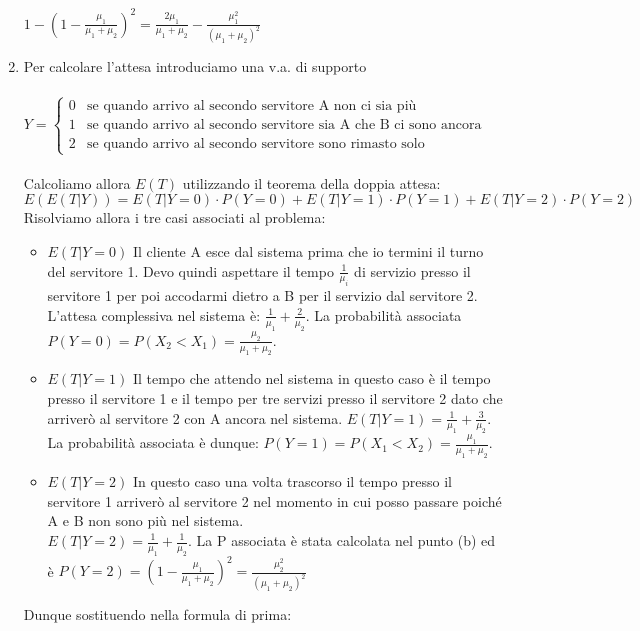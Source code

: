 \documentclass{oxmathproblems}
\begin{document}
\begin{questions}
\begin{solution}
\begin{enumerate}[label=(\alph*)]
        $1-(1-\frac{\mu_1}{\mu_1+\mu_2})^2 = \frac{2\mu_1}{\mu_1+\mu_2} - \frac{\mu_1^2}{(\mu_1+\mu_2)^2}$
        \item Per calcolare l'attesa introduciamo una v.a. di supporto\\ \\
        $Y= 
        \begin{cases}
            0 &\text{se quando arrivo al secondo servitore A non ci sia più}\\
            1 &\text{se quando arrivo al secondo servitore sia A che B ci sono ancora}\\
            2 &\text{se quando arrivo al secondo servitore sono rimasto solo}
        \end{cases}$\\\\
        Calcoliamo allora $E(T)$ utilizzando il teorema della doppia attesa:\\
        $E(E(T | Y)) = E(T | Y=0) \cdot P(Y=0) + E(T | Y=1) \cdot P(Y=1) + E(T | Y=2) \cdot P(Y=2)$\\
        Risolviamo allora i tre casi associati al problema:
        \begin{itemize}
            \item $E(T | Y=0)$ Il cliente A esce dal sistema prima che io termini il turno del servitore 1. Devo quindi aspettare il tempo $\frac{1}{\mu_i}$ di servizio presso il servitore 1 per poi accodarmi dietro a B per il servizio dal servitore 2. L'attesa complessiva nel sistema è: $\frac{1}{\mu_1} + \frac{2}{\mu_2}$. La probabilità associata $P(Y=0)= P(X_2< X_1) = \frac{\mu_2}{\mu_1+\mu_2}$.
            \item $E(T | Y=1)$ Il tempo che attendo nel sistema in questo caso è il tempo presso il servitore 1 e il tempo per tre servizi presso il servitore 2 dato che arriverò al servitore 2 con A ancora nel sistema. $E(T|Y=1)= \frac{1}{\mu_1} + \frac{3}{\mu_2}$. La probabilità associata è dunque: $P(Y=1) = P(X_1< X_2) = \frac{\mu_1}{\mu_1+\mu_2}$.
            \item $E(T | Y=2)$ In questo caso una volta trascorso il tempo presso il servitore 1 arriverò al servitore 2 nel momento in cui posso passare poiché A e B non sono più nel sistema.\\
            $E(T | Y=2) = \frac{1}{\mu_1}+\frac{1}{\mu_2}$. La P associata è stata calcolata nel punto (b) ed è $P(Y=2)= (1-\frac{\mu_1}{\mu_1+\mu_2})^2 = \frac{\mu_2^2}{(\mu_1+\mu_2)^2}$  
        \end{itemize}
        Dunque sostituendo nella formula di prima: \\

\end{enumerate}
\end{solution}
\end{questions}
\end{document}
